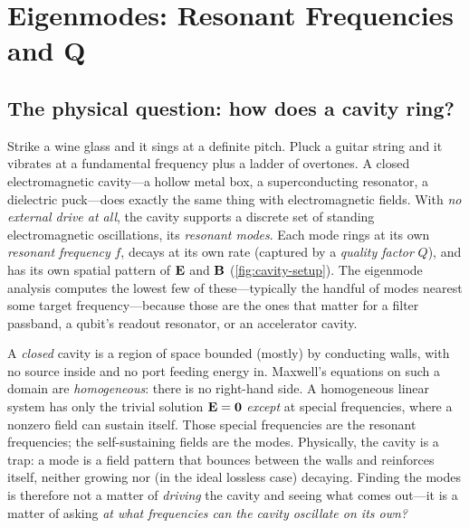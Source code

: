 \chapter{Eigenmodes: Resonant Frequencies and Q}
\label{ch:eigenmodes}


\section{The physical question: how does a cavity ring?}

Strike a wine glass and it sings at a definite pitch. Pluck a guitar string and
it vibrates at a fundamental frequency plus a ladder of overtones. A closed
electromagnetic cavity---a hollow metal box, a superconducting resonator, a
dielectric puck---does exactly the same thing with electromagnetic fields. With
\emph{no external drive at all}, the cavity supports a discrete set of standing
electromagnetic oscillations, its \emph{resonant modes}. Each mode rings at its
own \emph{resonant frequency} $f$, decays at its own rate (captured by a
\emph{quality factor} $Q$), and has its own spatial pattern of $\mathbf{E}$ and $\mathbf{B}$
(\cref{fig:cavity-setup}). The eigenmode analysis computes the lowest few of
these---typically the handful of modes nearest some target frequency---because
those are the ones that matter for a filter passband, a qubit's readout
resonator, or an accelerator cavity.

\begin{physicsbox}
A \emph{closed} cavity is a region of space bounded (mostly) by conducting
walls, with no source inside and no port feeding energy in. Maxwell's equations
on such a domain are \emph{homogeneous}: there is no right-hand side. A
homogeneous linear system has only the trivial solution $\mathbf{E}=\mathbf 0$
\emph{except} at special frequencies, where a nonzero field can sustain itself.
Those special frequencies are the resonant frequencies; the self-sustaining
fields are the modes. Physically, the cavity is a trap: a mode is a field
pattern that bounces between the walls and reinforces itself, neither growing nor
(in the ideal lossless case) decaying. Finding the modes is therefore not a
matter of \emph{driving} the cavity and seeing what comes out---it is a matter of
asking \emph{at what frequencies can the cavity oscillate on its own?}
\end{physicsbox}

